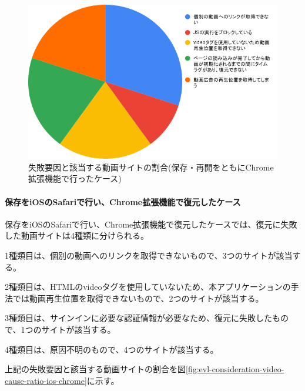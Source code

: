 \begin{figure}[htbp]
  \label{fig:evl-consideration-video-cause-ratio-chrome}
  \begin{center}
    \includegraphics[bb=0 0 600 371,width=15cm]{img/060_evaluation/consideration/video/cause-ratio-chrome.pdf}
  \end{center}
  \caption{失敗要因と該当する動画サイトの割合(保存・再開をともにChrome拡張機能で行ったケース)}
\end{figure}

\paragraph{保存をiOSのSafariで行い、Chrome拡張機能で復元したケース}
保存をiOSのSafariで行い、Chrome拡張機能で復元したケースでは、復元に失敗した動画サイトは4種類に分けられる。

1種類目は、個別の動画へのリンクを取得できないもので、3つのサイトが該当する。

2種類目は、HTMLのvideoタグを使用していないため、本アプリケーションの手法では動画再生位置を取得できないもので、2つのサイトが該当する。

3種類目は、サインインに必要な認証情報が必要なため、復元に失敗したもので、1つのサイトが該当する。

4種類目は、原因不明のもので、4つのサイトが該当する。

上記の失敗要因と該当する動画サイトの割合を図\ref{fig:evl-consideration-video-cause-ratio-ios-chrome}に示す。

